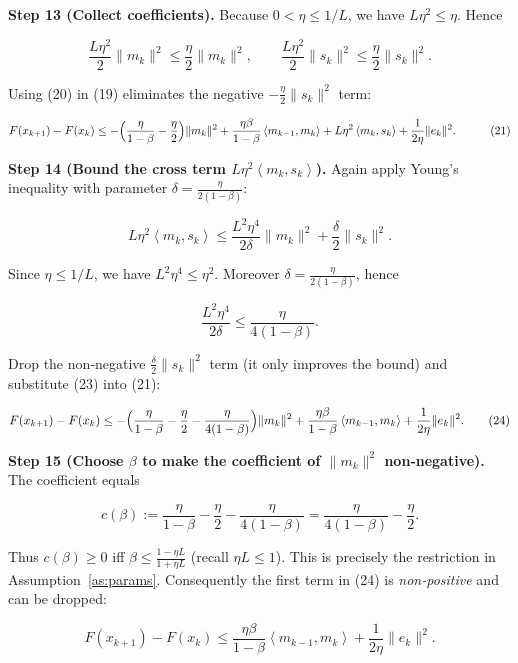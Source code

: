 \documentclass{article}
\newcommand{\inner}[2]{\left\langle #1,#2\right\rangle}
\begin{document}
\noindent\textbf{Step 13 (Collect coefficients).}  
Because $0<\eta\le 1/L$, we have $L\eta^{2}\le\eta$. Hence  

\[
\frac{L\eta^{2}}{2}\|m_{k}\|^{2}\le\frac{\eta}{2}\|m_{k}\|^{2},
\qquad
\frac{L\eta^{2}}{2}\|s_{k}\|^{2}\le\frac{\eta}{2}\|s_{k}\|^{2}.
\tag{20}
\]

Using (20) in (19) eliminates the negative $-\frac{\eta}{2}\|s_{k}\|^{2}$ term:

\[
\begin{aligned}
F(x_{k+1})-F(x_{k})
&\le -\Bigl(\frac{\eta}{1-\beta}-\frac{\eta}{2}\Bigr)\|m_{k}\|^{2}
   +\frac{\eta\beta}{1-\beta}\inner{m_{k-1}}{m_{k}}
   +L\eta^{2}\inner{m_{k}}{s_{k}}
   +\frac{1}{2\eta}\|e_{k}\|^{2}.
\end{aligned}
\tag{21}
\]

\noindent\textbf{Step 14 (Bound the cross term $L\eta^{2}\inner{m_{k}}{s_{k}}$).}  
Again apply Young’s inequality with parameter $\delta=\frac{\eta}{2(1-\beta)}$:

\[
L\eta^{2}\inner{m_{k}}{s_{k}}
\le \frac{L^{2}\eta^{4}}{2\delta}\|m_{k}\|^{2}
   +\frac{\delta}{2}\|s_{k}\|^{2}.
\tag{22}
\]

Since $\eta\le 1/L$, we have $L^{2}\eta^{4}\le \eta^{2}$. Moreover $\delta=\frac{\eta}{2(1-\beta)}$, hence  

\[
\frac{L^{2}\eta^{4}}{2\delta}\le\frac{\eta}{4(1-\beta)}.
\tag{23}
\]

Drop the non‑negative $\frac{\delta}{2}\|s_{k}\|^{2}$ term (it only improves the bound) and substitute (23) into (21):

\[
F(x_{k+1})-F(x_{k})
\le -\Bigl(\frac{\eta}{1-\beta}-\frac{\eta}{2}-\frac{\eta}{4(1-\beta)}\Bigr)\|m_{k}\|^{2}
   +\frac{\eta\beta}{1-\beta}\inner{m_{k-1}}{m_{k}}
   +\frac{1}{2\eta}\|e_{k}\|^{2}.
\tag{24}
\]

\noindent\textbf{Step 15 (Choose $\beta$ to make the coefficient of $\|m_{k}\|^{2}$ non‑negative).}  
The coefficient equals  

\[
c(\beta):=\frac{\eta}{1-\beta}-\frac{\eta}{2}-\frac{\eta}{4(1-\beta)}
      =\frac{\eta}{4(1-\beta)}-\frac{\eta}{2}.
\]

Thus $c(\beta)\ge0$ iff $\displaystyle\beta\le\frac{1-\eta L}{1+\eta L}$ (recall $\eta L\le1$). This is precisely the restriction in Assumption~\ref{as:params}. Consequently the first term in (24) is \emph{non‑positive} and can be dropped:

\[
F(x_{k+1})-F(x_{k})
\le \frac{\eta\beta}{1-\beta}\inner{m_{k-1}}{m_{k}}
   +\frac{1}{2\eta}\|e_{k}\|^{2}.
\tag{25}
\]
\end{document}
